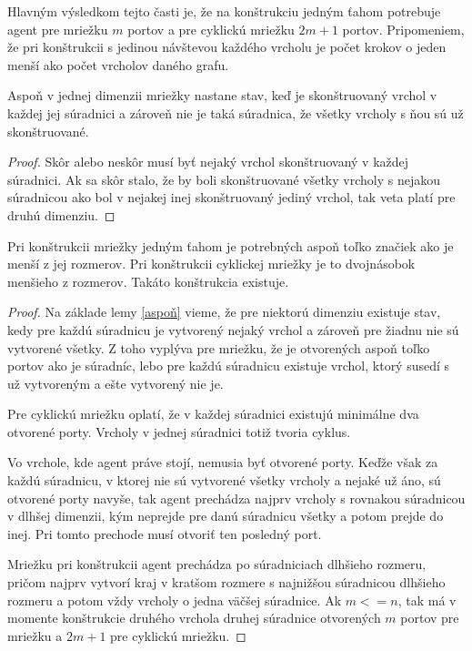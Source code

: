 Hlavným výsledkom tejto časti je, že na konštrukciu jedným ťahom potrebuje 
agent pre mriežku $m$ portov a pre
cyklickú mriežku $2m + 1$ portov. Pripomeniem, že pri konštrukcii s jedinou
návštevou každého vrcholu je počet krokov o jeden menší ako počet vrcholov
daného grafu.

\begin{lem}
\label{aspoň}
Aspoň v jednej dimenzii mriežky nastane stav, keď je skonštruovaný vrchol v každej
jej súradnici a zároveň nie je taká súradnica, že všetky vrcholy s ňou sú už
skonštruované.
\end{lem}

\begin{proof}
Skôr alebo neskôr musí byť nejaký vrchol skonštruovaný v každej súradnici.
Ak sa skôr stalo, že by boli skonštruované všetky vrcholy s nejakou
súradnicou ako bol v nejakej inej skonštruovaný jediný vrchol, tak veta
platí pre druhú dimenziu.
\end{proof}

\begin{veta}
Pri konštrukcii mriežky jedným ťahom je potrebných aspoň toľko značiek ako
je menší z jej rozmerov. Pri konštrukcii cyklickej mriežky je to dvojnásobok
menšieho z rozmerov. Takáto konštrukcia existuje.
\end{veta}
\begin{proof}
Na základe lemy \ref{aspoň} vieme, že pre niektorú dimenziu existuje stav,
kedy pre každú súradnicu je vytvorený nejaký vrchol a zároveň pre žiadnu nie
sú vytvorené všetky. Z toho vyplýva pre mriežku, že je otvorených aspoň
toľko portov ako je súradníc, lebo pre každú súradnicu existuje vrchol,
ktorý susedí s už vytvoreným a ešte vytvorený nie je.

Pre cyklickú mriežku oplatí, že v každej súradnici existujú minimálne dva
otvorené porty. Vrcholy v jednej súradnici totiž tvoria cyklus.

Vo vrchole, kde agent práve stojí, nemusia byť otvorené porty. Keďže však za
každú súradnicu, v ktorej nie sú vytvorené všetky vrcholy a nejaké už áno,
sú otvorené porty navyše, tak agent prechádza najprv vrcholy s rovnakou 
súradnicou v dlhšej dimenzii, kým neprejde pre danú súradnicu všetky a potom
prejde do inej. Pri tomto prechode musí otvoriť ten posledný port.

Mriežku pri konštrukcii agent prechádza po súradniciach dlhšieho rozmeru,
pričom najprv vytvorí kraj v kratšom rozmere s najnižšou súradnicou dlhšieho
rozmeru a potom vždy vrcholy o jedna väčšej súradnice. Ak $m <= n$, tak má v
momente konštrukcie druhého vrchola druhej súradnice otvorených $m$ portov
pre mriežku a $2m + 1$ pre cyklickú mriežku.
\end{proof}


